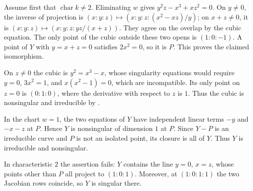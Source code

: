 Assume first that $\operatorname{char}k\ne2$. Eliminating $w$ gives $y^2z-x^3+xz^2=0$. On $y\ne0$, the inverse of projection is $(x:y:z)\mapsto(x:y:z:(x^2-xz)/y)$; on $x+z\ne0$, it is $(x:y:z)\mapsto(x:y:z:yz/(x+z))$. They agree on the overlap by the cubic equation. The only point of the cubic outside these two opens is $(1:0:-1)$. A point of $Y$ with $y=x+z=0$ satisfies $2x^2=0$, so it is $P$. This proves the claimed isomorphism.

On $z\ne0$ the cubic is $y^2=x^3-x$, whose singularity equations would require $y=0$, $3x^2=1$, and $x(x^2-1)=0$, which are incompatible. Its only point on $z=0$ is $(0:1:0)$, where the derivative with respect to $z$ is $1$. Thus the cubic is nonsingular and irreducible by .

In the chart $w=1$, the two equations of $Y$ have independent linear terms $-y$ and $-x-z$ at $P$. Hence $Y$ is nonsingular of dimension $1$ at $P$. Since $Y-P$ is an irreducible curve and $P$ is not an isolated point, its closure is all of $Y$. Thus $Y$ is irreducible and nonsingular.

In characteristic $2$ the assertion fails: $Y$ contains the line $y=0$, $x=z$, whose points other than $P$ all project to $(1:0:1)$. Moreover, at $(1:0:1:1)$ the two Jacobian rows coincide, so $Y$ is singular there.
